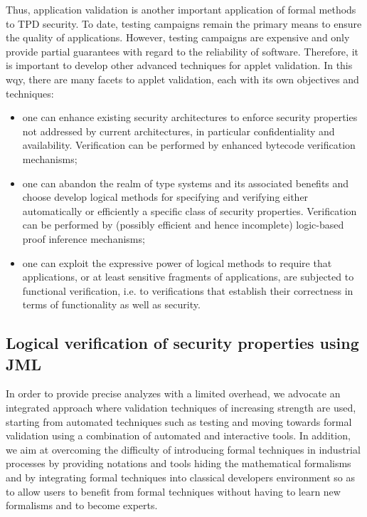 Thus, application validation is another important application of
formal methods to TPD security. To date, testing campaigns remain the
primary means to ensure the quality of applications. However, testing
campaigns are expensive and only provide partial guarantees with
regard to the reliability of software. Therefore, it is important to
develop other advanced techniques for applet validation. In this wqy, there are many facets to applet validation, each with its own
objectives and techniques:
\begin{itemize}
\item one can enhance existing security architectures to enforce
security properties not addressed by current architectures, in
particular confidentiality and availability.  Verification can be
performed by enhanced bytecode verification mechanisms;

\item one can abandon the realm of type systems and its associated
benefits and choose develop logical methods for specifying and
verifying either automatically or efficiently a specific class of
security properties. Verification can be performed by (possibly
efficient and hence incomplete) logic-based proof inference
mechanisms;

\item one can exploit the expressive power of logical methods to
require that applications, or at least sensitive fragments of
applications, are subjected to functional verification, i.e. to
verifications that establish their correctness in terms of
functionality as well as security.
\end{itemize}

\subsection{Logical verification of security properties using JML}
In order to provide precise analyzes with a limited overhead, we
advocate an integrated approach where validation techniques of
increasing strength are used, starting from automated techniques such
as testing and moving towards formal validation using a combination of
automated and interactive tools. In addition, we aim at overcoming the
difficulty of introducing formal techniques in industrial processes by
providing notations and tools hiding the mathematical formalisms and
by integrating formal techniques into classical developers environment
so as to allow users to benefit from formal techniques without having
to learn new formalisms and to become experts.

